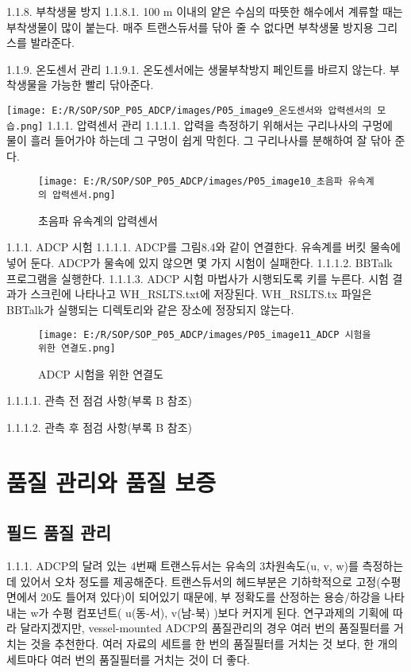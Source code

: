 \documentclass[
]{book}
\begin{document}
1.1.8. 부착생물 방지
1.1.8.1. 100 m 이내의 얕은 수심의 따뜻한 해수에서 계류할 때는 부착생물이 많이 붙는다. 매주 트랜스듀서를 닦아 줄 수 없다면 부착생물 방지용 그리스를 발라준다.

1.1.9. 온도센서 관리
1.1.9.1. 온도센서에는 생물부착방지 페인트를 바르지 않는다. 부착생물을 가능한 빨리 닦아준다.

\texttt{[image: E:/R/SOP/SOP\_P05\_ADCP/images/P05\_image9\_온도센서와 압력센서의 모습.png]}
1.1.1. 압력센서 관리
1.1.1.1. 압력을 측정하기 위해서는 구리나사의 구멍에 물이 흘러 들어가야 하는데 그 구멍이 쉽게 막힌다. 그 구리나사를 분해하여 잘 닦아 준다.

\begin{figure}
\centering
\texttt{[image: E:/R/SOP/SOP\_P05\_ADCP/images/P05\_image10\_초음파 유속계의 압력센서.png]}
\caption{초음파 유속계의 압력센서}
\end{figure}

1.1.1. ADCP 시험
1.1.1.1. ADCP를 그림8.4와 같이 연결한다. 유속계를 버킷 물속에 넣어 둔다. ADCP가 물속에 있지 않으면 몇 가지 시험이 실패한다.
1.1.1.2. BBTalk 프로그램을 실행한다.
1.1.1.3. ADCP 시험 마법사가 시행되도록 키를 누른다. 시험 결과가 스크린에 나타나고 WH\_RSLTS.txt에 저장된다. WH\_RSLTS.tx 파일은 BBTalk가 실행되는 디렉토리와 같은 장소에 정장되지 않는다.

\begin{figure}
\centering
\texttt{[image: E:/R/SOP/SOP\_P05\_ADCP/images/P05\_image11\_ADCP 시험을 위한 연결도.png]}
\caption{ADCP 시험을 위한 연결도}
\end{figure}

1.1.1.1. 관측 전 점검 사항(부록 B 참조)

1.1.1.2. 관측 후 점검 사항(부록 B 참조)

\hypertarget{uxd488uxc9c8-uxad00uxb9acuxc640-uxd488uxc9c8-uxbcf4uxc99d-1}{%
\section{품질 관리와 품질 보증}\label{uxd488uxc9c8-uxad00uxb9acuxc640-uxd488uxc9c8-uxbcf4uxc99d-1}}

\hypertarget{uxd544uxb4dc-uxd488uxc9c8-uxad00uxb9ac}{%
\subsection{필드 품질 관리}\label{uxd544uxb4dc-uxd488uxc9c8-uxad00uxb9ac}}

1.1.1. ADCP의 달려 있는 4번째 트랜스듀서는 유속의 3차원속도(u, v, w)를 측정하는데 있어서 오차 정도를 제공해준다. 트랜스듀서의 헤드부분은 기하학적으로 고정(수평면에서 20도 틀어져 있다)이 되어있기 때문에, 부 정확도를 산정하는 용승/하강을 나타내는 w가 수평 컴포넌트( u(동-서), v(남-북) )보다 커지게 된다. 연구과제의 기획에 따라 달라지겠지만, vessel-mounted ADCP의 품질관리의 경우 여러 번의 품질필터를 거치는 것을 추천한다. 여러 자료의 세트를 한 번의 품질필터를 거치는 것 보다, 한 개의 세트마다 여러 번의 품질필터를 거치는 것이 더 좋다.
\end{document}

